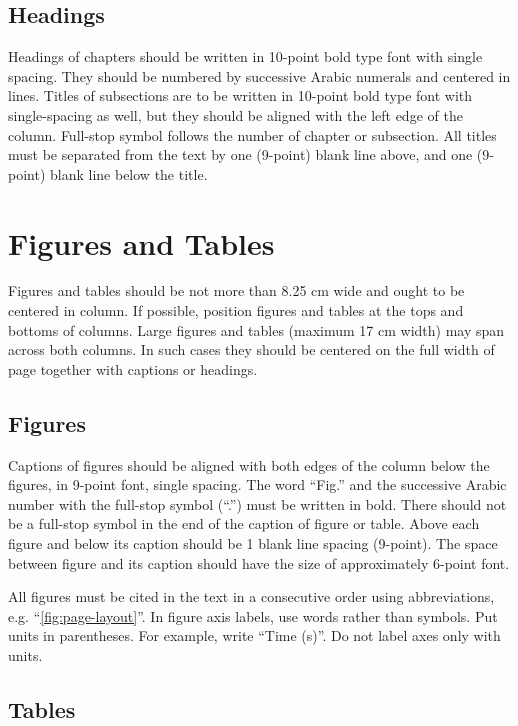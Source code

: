 \documentclass[9pt]{extarticle}
\begin{document}
\subsection{Headings}

Headings of chapters should be written in 10-point bold type font with single spacing. They should be numbered by successive Arabic numerals and centered in lines. Titles of subsections are to be written in 10-point bold type font with single-spacing as well, but they should be aligned with the left edge of the column. Full-stop symbol follows the number of chapter or subsection. All titles must be separated from the text by one (9-point) blank line above, and one (9-point) blank line below the title.

\section{Figures and Tables}

Figures and tables should be not more than 8.25 cm wide and ought to be centered in column. If possible, position figures and tables at the tops and bottoms of columns. Large figures and tables (maximum 17 cm width) may span across both columns. In such cases they should be centered on the full width of page together with captions or headings.

\subsection{Figures}

Captions of figures should be aligned with both edges of the column below the figures, in 9-point font, single spacing. The word ``Fig.'' and the successive Arabic number with the full-stop symbol (``.'') must be written in bold. There should not be a full-stop symbol in the end of the caption of figure or table. Above each figure and below its caption should be 1 blank line spacing (9-point). The space between figure and its caption should have the size of approximately 6-point font.

All figures must be cited in the text in a consecutive order using abbreviations, e.g. ``\cref{fig:page-layout}''. In figure axis labels, use words rather than symbols. Put units in parentheses. For example, write ``Time (s)''. Do not label axes only with units.

\subsection{Tables}
\end{document}
